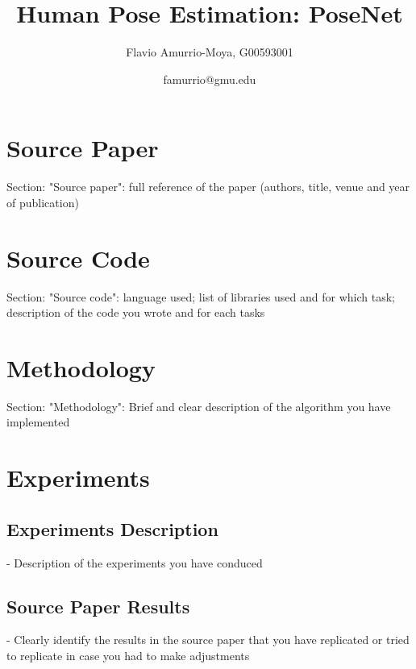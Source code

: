 \documentclass[12pt]{extarticle}
\title{Human Pose Estimation: PoseNet}
\author{Flavio Amurrio-Moya, G00593001}
\date{famurrio@gmu.edu}
\begin{document}
\maketitle

\newpage


\section{Source Paper}
Section: "Source paper": full reference of the paper (authors, title, venue and year of publication)

\section{Source Code}
Section: "Source code": language used; list of libraries used and for which task; description of the code you wrote and for each tasks

\section{Methodology}
Section: "Methodology": Brief and clear description of the algorithm you have implemented

\section{Experiments}

\subsection{Experiments Description}
- Description of the experiments you have conduced

\subsection{Source Paper Results}
- Clearly identify the results in the source paper that you have replicated or tried to replicate in case you had to make adjustments
\end{document}
